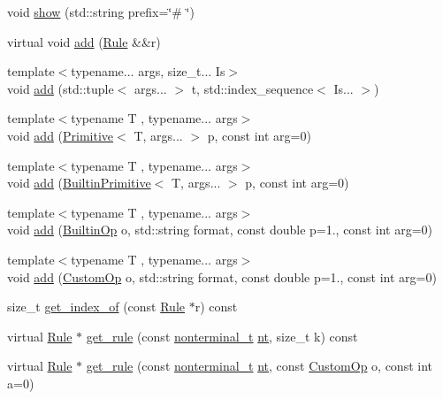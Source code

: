\begin{DoxyCompactItemize}
\item 
void \hyperlink{class_grammar_aa3c730ea64c8ca5d93fecb4275f2e380}{show} (std\+::string prefix=\char`\"{}\# \char`\"{})
\item 
virtual void \hyperlink{class_grammar_af0b97cbaf14fc6be7495c8bb9e888002}{add} (\hyperlink{class_rule}{Rule} \&\&r)
\item 
{\footnotesize template$<$typename... args, size\+\_\+t... Is$>$ }\\void \hyperlink{class_grammar_a37a1dd90b7a315fe97bbdefad7c09df9}{add} (std\+::tuple$<$ args... $>$ t, std\+::index\+\_\+sequence$<$ Is... $>$)
\item 
{\footnotesize template$<$typename T , typename... args$>$ }\\void \hyperlink{class_grammar_a0af8f369b948cde8ee5d403311ec8fa9}{add} (\hyperlink{struct_primitive}{Primitive}$<$ T, args... $>$ p, const int arg=0)
\item 
{\footnotesize template$<$typename T , typename... args$>$ }\\void \hyperlink{class_grammar_af96467de4413d3e5a0d2f291992365d9}{add} (\hyperlink{struct_builtin_primitive}{Builtin\+Primitive}$<$ T, args... $>$ p, const int arg=0)
\item 
{\footnotesize template$<$typename T , typename... args$>$ }\\void \hyperlink{class_grammar_a562f3b4113e3f2764832ac828ffb58fc}{add} (\hyperlink{_instruction_8h_af2fb7c87c5854c5733d7bb0506b06de7}{Builtin\+Op} o, std\+::string format, const double p=1., const int arg=0)
\item 
{\footnotesize template$<$typename T , typename... args$>$ }\\void \hyperlink{class_grammar_aba61b4a7563c249a27ad7b6b808ee575}{add} (\hyperlink{_instruction_8h_a3a20ca4a8f0ab220518b030cc23ffee4}{Custom\+Op} o, std\+::string format, const double p=1., const int arg=0)
\item 
size\+\_\+t \hyperlink{class_grammar_affec19f6e91201c8d29119bf50ffa3e6}{get\+\_\+index\+\_\+of} (const \hyperlink{class_rule}{Rule} $\ast$r) const
\item 
virtual \hyperlink{class_rule}{Rule} $\ast$ \hyperlink{class_grammar_aea24b7ae4a2d61f322504a9f49478bb4}{get\+\_\+rule} (const \hyperlink{_nonterminal_8h_a5c1f658dc7560600a16d22408bd716ca}{nonterminal\+\_\+t} \hyperlink{class_grammar_aa5c9afa0e7e1aa989b54402b02a677a3}{nt}, size\+\_\+t k) const
\item 
virtual \hyperlink{class_rule}{Rule} $\ast$ \hyperlink{class_grammar_aa642e370571830772b8d3be70cb5a5c7}{get\+\_\+rule} (const \hyperlink{_nonterminal_8h_a5c1f658dc7560600a16d22408bd716ca}{nonterminal\+\_\+t} \hyperlink{class_grammar_aa5c9afa0e7e1aa989b54402b02a677a3}{nt}, const \hyperlink{_instruction_8h_a3a20ca4a8f0ab220518b030cc23ffee4}{Custom\+Op} o, const int a=0)

\end{DoxyCompactItemize}
